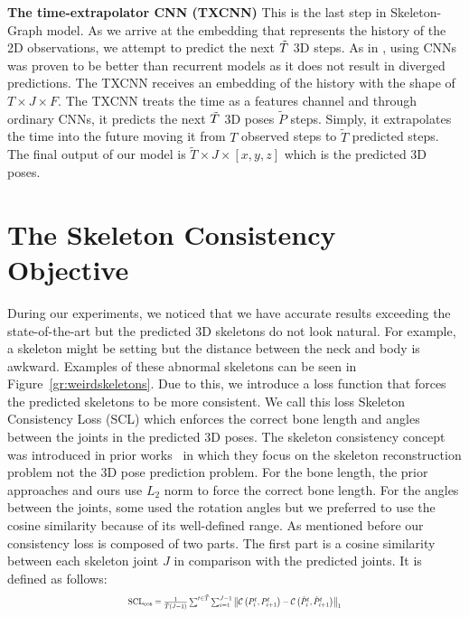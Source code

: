 \documentclass[10pt,twocolumn,letterpaper]{article}
\newcommand*{\ours}{Skeleton-Graph }
\begin{document}
\textbf{The time-extrapolator CNN (TXCNN)}
This is the last step in \ours model. As we arrive at the embedding that represents the history of the 2D observations, we attempt to predict the next $\Tilde{T}$ 3D steps. As in \cite{mohamed2020social,bai2018empirical,malla2020social,wang2021graphtcn,zhao2020noticing}, using CNNs was proven to be better than recurrent models as it does not result in diverged predictions. The TXCNN receives an embedding of the history with the shape of $T \times J \times F$. The TXCNN treats the time as a features channel and through ordinary CNNs, it predicts the next $\Tilde{T}$ 3D poses $\tilde{P}$ steps. Simply, it extrapolates the time into the future moving it from $T$ observed steps to $\tilde{T}$ predicted steps. The final output of our model is $\tilde{T} \times J \times [x,y,z]$ which is the predicted 3D poses.
\section{The Skeleton Consistency Objective}
During our experiments, we noticed that we have accurate results exceeding the state-of-the-art but the predicted 3D skeletons do not look natural. For example, a skeleton might be setting but the distance between the neck and body is awkward. Examples of these abnormal skeletons can be seen in Figure~\ref{gr:weirdskeletons}. Due to this, we introduce a loss function that forces the predicted skeletons to be more consistent. We call this loss Skeleton Consistency Loss (SCL) which enforces the correct bone length and angles between the joints in the predicted 3D poses. The skeleton consistency concept was introduced in prior works~\cite{brau20163d, dabral2018learning, ramakrishna2012reconstructing, bkak2016recent,shi2020motionet} in which they focus on the skeleton reconstruction problem not the 3D pose prediction problem. For the bone length, the prior approaches and ours use $L_2$ norm to force the correct bone length. For the angles between the joints, some used the rotation angles but we preferred to use the cosine similarity because of its well-defined range. As mentioned before our consistency loss is composed of two parts. The first part is a cosine similarity between each skeleton joint $J$ in comparison with the predicted joints. It is defined as follows: 
\[
    \resizebox{0.49\textwidth}{!}{$\text{SCL}_{\text{cos}} = \frac{1}{\tilde{T}(J-1)}\sum^{t \in\tilde{T}}  \sum_{i = 1 }^{J-1} \left \|\mathcal{C} \left(P^t_i,P^t_{i+1}\right) - \mathcal{C} \left(\tilde{P}^t_i,\tilde{P}^t_{i+1}\right) \right\|_{1}$}
\]
\end{document}
